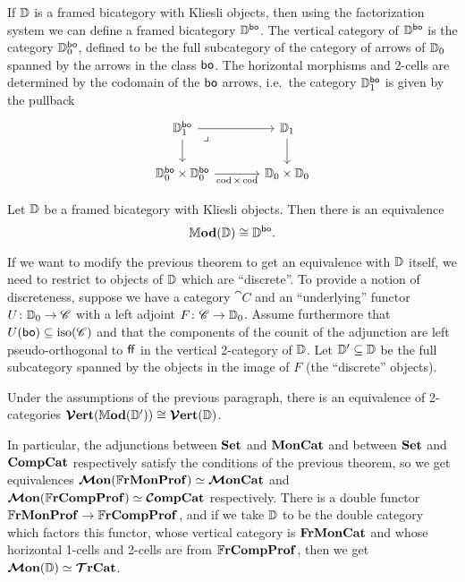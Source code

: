 \documentclass[12pt,oneside,article,draft]{memoir}
\begin{document}
If $\mathbb{D}$ is a framed bicategory with Kliesli objects, then using the factorization system we can define a framed bicategory $\mathbb{D}^{\mathsf{bo}}$.
The vertical category of $\mathbb{D}^{\mathsf{bo}}$ is the category $\mathbb{D}_0^{\mathsf{bo}}$, defined to be the full subcategory of the category of arrows of $\mathbb{D}_0$ spanned by the arrows in the class $\mathsf{bo}$.
The horizontal morphisms and 2-cells are determined by the codomain of the $\mathsf{bo}$ arrows, i.e.~the category $\mathbb{D}_1^{\mathsf{bo}}$ is given by the pullback
\[
\begin{tikzcd}[column sep=large]
   \dcat{D}_1^{\bo} \ar[r] \ar[d] \ar[dr,phantom,"\lrcorner" very near start]
      & \dcat{D}_1 \ar[d] \\
   \dcat{D}_0^{\bo}\times\dcat{D}_0^{\bo} \ar[r,"\cod\times\cod"']
      & \dcat{D}_0\times\dcat{D}_0
\end{tikzcd}
\]

\begin{theorem}
   Let $\mathbb{D}$ be a framed bicategory with Kliesli objects. Then there is an equivalence
   \[
      \mathbb{M}\mathbf{od}(\mathbb{D}) \cong \mathbb{D}^{\mathsf{bo}}.
   \]
\end{theorem}

If we want to modify the previous theorem to get an equivalence with $\mathbb{D}$ itself, we need to restrict to objects of $\mathbb{D}$ which are ``discrete''.
To provide a notion of discreteness, suppose we have a category $\cat{C}$ and an ``underlying'' functor $U\colon\mathbb{D}_0\to\mathscr{C}$ with a left adjoint $F\colon\mathscr{C}\to\mathbb{D}_0$.
Assume furthermore that $U(\mathsf{bo})\subseteq\mathrm{iso}(\mathscr{C})$ and that the components of the counit of the adjunction are left pseudo-orthogonal to $\mathsf{ff}$ in the vertical 2-category of $\mathbb{D}$.
Let $\mathbb{D}'\subseteq\mathbb{D}$ be the full subcategory spanned by the objects in the image of $F$ (the ``discrete'' objects).

\begin{theorem}
   Under the assumptions of the previous paragraph, there is an equivalence of 2-categories $\bm{\mathcal{V}}\mathbf{ert}(\mathbb{M}\mathbf{od}(\mathbb{D}'))\cong\bm{\mathcal{V}}\mathbf{ert}(\mathbb{D})$.
\end{theorem}

In particular, the adjunctions between $\mathbf{Set}$ and $\mathbf{MonCat}$ and between $\mathbf{Set}$ and $\mathbf{CompCat}$ respectively satisfy the conditions of the previous theorem, so we get equivalences $\bm{\mathcal{M}}\mathbf{on}(\mathbb{F}\mathbf{rMonProf})\simeq\bm{\mathcal{M}}\mathbf{onCat}$ and $\bm{\mathcal{M}}\mathbf{on}(\mathbb{F}\mathbf{rCompProf})\simeq\bm{\mathcal{C}}\mathbf{ompCat}$ respectively. There is a double functor $\mathbb{F}\mathbf{rMonProf}\to\mathbb{F}\mathbf{rCompProf}$, and if we take $\mathbb{D}$ to be the double category which factors this functor, whose vertical category is $\mathbf{FrMonCat}$ and whose horizontal 1-cells and 2-cells are from $\mathbb{F}\mathbf{rCompProf}$, then we get $\bm{\mathcal{M}}\mathbf{on}(\mathbb{D})\simeq\bm{\mathcal{T}}\mathbf{rCat}$.
\end{document}
